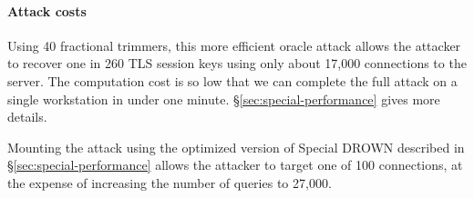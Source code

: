 \paragraph{Attack costs}
Using 40 fractional trimmers, this more efficient oracle attack allows
the attacker to recover one in 260 TLS session keys using only about
17,000 connections to the server.  The computation cost is so low that
we can complete the full attack on a single workstation in under one
minute. \S\ref{sec:special-performance} gives more details.

Mounting the attack using the optimized version of Special DROWN
described in \S\ref{sec:special-performance} allows the
attacker to target one of 100 connections, at the expense of
increasing the number of queries to 27,000.


